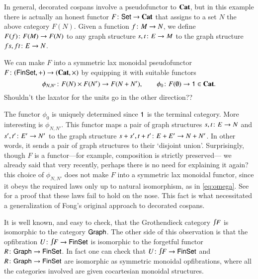\documentclass[reqno]{amsart}
\begin{document}
In general, decorated cospans involve a pseudofunctor to $\mathbf{Cat}$, but in this example there is actually an honest functor $F \colon \mathsf{Set} \to \mathbf{Cat}$ that assigns to a set $N$ the above category $F(N)$.   Given a function $f \colon M \to N$, we define $F(f) \colon F(M) \to F(N)$ to any graph structure $s,t \colon E \to M$ to the graph structure $f s, f t \colon E \to N$.   

We can make $F$ into a symmetric lax monoidal pseudofunctor $F \colon (\mathsf{Fin}\mathsf{Set}, +) \to (\mathbf{Cat},\times)$ by equipping it with suitable functors 
\[   \phi_{N,N'} \colon F(N) \times F(N') \to F(N+N'), \qquad \phi_0 \colon F(\emptyset) \to \mathsf{1} \in \mathbf{Cat}. \]  
{\chris Shouldn't the laxator for the units go in the other direction??}

The functor $\phi_0$ is uniquely determined since $\mathsf{1}$ is the terminal category.   More interesting is $\phi_{N,N'}$.   This functor maps a pair of graph structures $s, t \colon E \to N$ and $s',t' \colon E' \to N'$ to the graph structure $s+s', t+t' \colon E+E' \to N+N'$.  In other words, it sends a pair of graph structures to their `disjoint union'.   Surprisingly, though $F$ is a functor---for example, composition is strictly preserved---
{\chris we already said that very recently, perhaps there is no need for explaining it again?}
this choice of $\phi_{N,N'}$ does not make $F$ into a symmetric lax monoidal functor, since it obeys the required laws only up to natural isomorphism, as in \cref{eq:omega}.   See \cite[Section 5]{BC} for a proof that these laws fail to hold on the nose.   This fact is what necessitated a generalization of Fong's original approach to decorated cospans.

It is well known, and easy to check, that the Grothendieck category $\inta F$ is isomorphic to the category $\mathsf{Graph}$.   The other side of this observation is that the opfibration $U \maps \inta F \to \Fin\Set$ is isomorphic to the forgetful functor $R \colon \mathsf{Graph} \to \mathsf{Fin}\mathsf{Set}$.    In fact one can check that $U \maps \inta F \to \Fin\Set$ and $R \colon \mathsf{Graph} \to \mathsf{Fin}\mathsf{Set}$ are isomorphic as symmetric monoidal opfibrations, where all the categories involved are given cocartesian monoidal structures.
\end{document}
